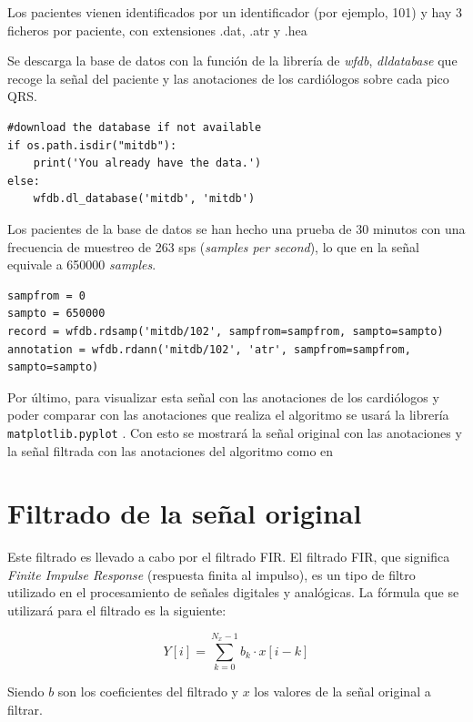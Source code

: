 Los pacientes vienen identificados por un identificador (por ejemplo, 101) y hay 3 ficheros por paciente, 
con extensiones .dat, .atr y .hea

Se descarga la base de datos \cite{desai2021low} con la función de la librería de \textit{wfdb}, \textit{dldatabase} que recoge 
la señal del paciente y las anotaciones de los cardiólogos sobre cada pico QRS.


\lstset{language=python, breaklines=true, basicstyle=\footnotesize}
\begin{lstlisting}[frame=single]
#download the database if not available
if os.path.isdir("mitdb"):
	print('You already have the data.')
else:
	wfdb.dl_database('mitdb', 'mitdb')
\end{lstlisting}

Los pacientes de la base de datos se han hecho una prueba de 30 minutos con una frecuencia de muestreo de 263 sps (\textit{samples per second}), lo que en la señal 
equivale a 650000 \textit{samples}.

\lstset{language=python, breaklines=true, basicstyle=\footnotesize}
\begin{lstlisting}[frame=single]
sampfrom = 0
sampto = 650000
record = wfdb.rdsamp('mitdb/102', sampfrom=sampfrom, sampto=sampto)
annotation = wfdb.rdann('mitdb/102', 'atr', sampfrom=sampfrom, sampto=sampto)
\end{lstlisting}

Por último, para visualizar esta señal con las anotaciones de los cardiólogos y poder comparar con las anotaciones que realiza el algoritmo se usará la librería \lstinline{matplotlib.pyplot} \cite{Matplotlib}. Con esto se mostrará la señal original con las anotaciones y la señal filtrada con las anotaciones del algoritmo como en 

\section{Filtrado de la señal original}
Este filtrado es llevado a cabo por el filtrado FIR. El filtrado FIR, que significa \textit{Finite Impulse Response} (respuesta finita al impulso), es un tipo de filtro utilizado en el procesamiento de señales digitales y analógicas. La fórmula que se utilizará para el filtrado es la siguiente:

\[ Y[i] = \sum_{k=0}^{N_x -1} b_k \cdot x[i-k] \]

Siendo $b$ son los coeficientes del filtrado y $x$ los valores de la señal original a filtrar.


